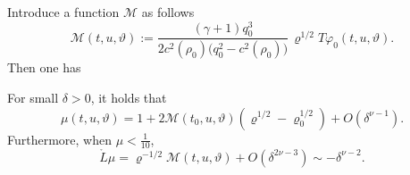 \documentclass[11pt,twoside]{article}
\begin{document}
Introduce a function $\mathscr{M}$ as follows
\[
\mathscr{M}(t,u,\vartheta) := \frac{(\gamma+1) q_{0}^{3}} {2c^{2}(\rho_{0})\big(q_{0}^{2}-c^{2}(\rho_{0}) \big)} \,\varrho^{1/2} T\varphi_{0}(t,u,\vartheta).
\]
Then one has
\begin{proposition}\label{Prop.5.1}
 For small $\delta > 0$, it holds that
 \begin{equation}\label{mathM}
 \mu(t,u,\vartheta) = 1 + 2\mathscr{M}(t_0,u,\vartheta)(\varrho^{1/2} - \varrho_0^{1/2}) + O(\delta^{\nu-1}).
 \end{equation}
 Furthermore, when $\mu < \frac{1}{10}$,
 \begin{equation}\label{blowup}
 \mathring{L}\mu=\varrho^{-1/2}\mathscr M(t,u,\vartheta)+O(\delta^{2\nu-3}) \sim -\delta^{\nu-2}.
 \end{equation}
\end{proposition}
\end{document}
